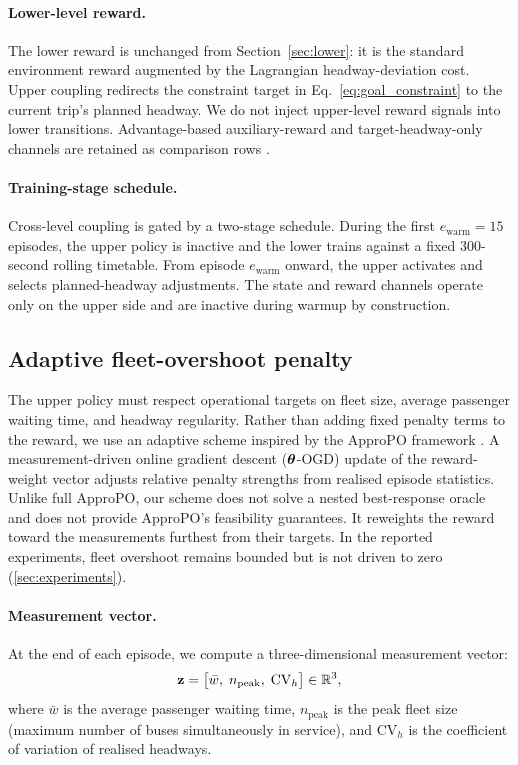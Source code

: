 \paragraph{Lower-level reward.}
The lower reward is unchanged from Section~\ref{sec:lower}: it is the standard environment reward augmented by the Lagrangian headway-deviation cost. Upper coupling redirects the constraint target in Eq.~\ref{eq:goal_constraint} to the current trip's planned headway. We do not inject upper-level reward signals into lower transitions. Advantage-based auxiliary-reward and target-headway-only channels are retained as comparison rows \citep{li2019hierarchical,singh2024piper}.

\paragraph{Training-stage schedule.}
Cross-level coupling is gated by a two-stage schedule. During the first $e_{\mathrm{warm}} = 15$ episodes, the upper policy is inactive and the lower trains against a fixed 300-second rolling timetable. From episode $e_{\mathrm{warm}}$ onward, the upper activates and selects planned-headway adjustments. The state and reward channels operate only on the upper side and are inactive during warmup by construction.

\subsection{Adaptive fleet-overshoot penalty}
\label{sec:meas_proj}

The upper policy must respect operational targets on fleet size, average passenger waiting time, and headway regularity.
Rather than adding fixed penalty terms to the reward, we use an adaptive scheme inspired by the ApproPO framework \citep{miryoosefi2019reinforcement}. A measurement-driven online gradient descent ($\boldsymbol{\theta}$-OGD) update of the reward-weight vector adjusts relative penalty strengths from realised episode statistics. Unlike full ApproPO, our scheme does not solve a nested best-response oracle and does not provide ApproPO's feasibility guarantees. It reweights the reward toward the measurements furthest from their targets. In the reported experiments, fleet overshoot remains bounded but is not driven to zero (\cref{sec:experiments}).

\paragraph{Measurement vector.}
At the end of each episode, we compute a three-dimensional measurement vector:
\begin{equation}
\label{eq:measurement_method}
    \mathbf{z} = \bigl[\bar{w},\; n_{\mathrm{peak}},\; \mathrm{CV}_{h}\bigr] \in \mathbb{R}^3,
\end{equation}
where $\bar{w}$ is the average passenger waiting time, $n_{\mathrm{peak}}$ is the peak fleet size (maximum number of buses simultaneously in service), and $\mathrm{CV}_{h}$ is the coefficient of variation of realised headways.

